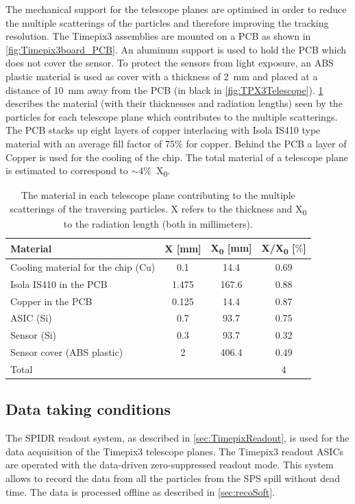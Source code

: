 The mechanical support for the telescope planes are optimised in order
to reduce the multiple scatterings of the particles and therefore
improving the tracking resolution. The Timepix3 assemblies are mounted
on a PCB as shown in \cref{fig:Timepix3board_PCB}. An aluminum support
is used to hold the PCB which does not cover the sensor. To protect
the sensors from light exposure, an ABS plastic material is used as
cover with a thickness of 2~mm and placed at a distance of 10~mm away
from the PCB (in black in
\cref{fig:TPX3Telescope}). \cref{tab:TPX3TelescopeMaterial} describes
the material (with their thicknesses and radiation lengths) seen by
the particles for each telescope plane which contributes to the
multiple scatterings. The PCB stacks up eight layers of copper
interlacing with Isola IS410 type material with an average fill factor
of $75\%$ for copper. Behind the PCB a layer of Copper is used for the
cooling of the chip. The total material of a telescope plane is
estimated to correspond to $\sim4\%$~X\textsubscript{0}.

\begin{table}[htbp]
  \centering
  \caption{The material in each telescope plane contributing to the
    multiple scatterings of the traversing particles. X refers to the thickness and X\textsubscript{0} to the radiation
    length (both in millimeters).}
  \label{tab:TPX3TelescopeMaterial}
  \begin{tabular}{l c c c}
    \toprule
    Material & X [mm] & X\textsubscript{0} [mm] & X/X\textsubscript{0} [$\%$] \\
    \midrule
    Cooling material for the chip (Cu) & 0.1 & 14.4 & 0.69 \\
    Isola IS410 in the PCB & 1.475 & 167.6 & 0.88 \\
    Copper in the PCB & 0.125 & 14.4 & 0.87 \\
    ASIC (Si) & 0.7 & 93.7 & 0.75\\
    Sensor (Si) & 0.3 & 93.7 & 0.32\\ 
    Sensor cover (ABS plastic) & 2 & 406.4 & 0.49 \\ \hline
    Total & & & 4 \\
    \bottomrule
  \end{tabular}
\end{table}

\subsection{Data taking conditions}
The SPIDR readout system, as described in \cref{sec:TimepixReadout},
is used for the data acquisition of the Timepix3 telescope planes. The
Timepix3 readout ASICs are operated with the data-driven
zero-suppressed readout mode. This system allows to record the data
from all the particles from the SPS spill without dead time. The data
is processed offline as described in \cref{sec:recoSoft}.


